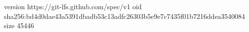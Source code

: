 version https://git-lfs.github.com/spec/v1
oid sha256:bd4d0dae43a5391dbadb53c13adfc26303b5e9e7c7435f01b7216ddea3540084
size 45446

